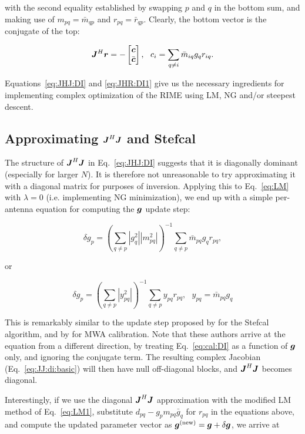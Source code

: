 \documentclass[useAMS,usenatbib]{mn2e}
\newcommand{\mat}[1]{{\bmath{#1}}}
\newcommand{\JJ}{\mat{J}} %
\begin{document}
with the second equality established by swapping $p$ and $q$ in the bottom sum, and making use of $m_{pq}=\bar{m}_{qp}$ and $r_{pq}=\bar{r}_{qp}$. Clearly, the bottom vector is the conjugate of the top:

\begin{equation}
\label{eq:JHR:DI1}
\JJ^H\bmath{r} = -\Matrix{c}{\bmath{c}\\\bar{\bmath{c}}},~~c_i = \sum\limits_{q\ne i} \bar{m}_{iq} g_q r_{iq}.
\end{equation}

Equations~\ref{eq:JHJ:DI} and \ref{eq:JHR:DI1} give us the necessary ingredients for implementing complex
optimization of the RIME using LM, NG and/or steepest descent. 

\subsection{Approximating $\JJ^H\JJ$ and Stefcal}

The structure of $\JJ^H\JJ$ in Eq.~\ref{eq:JHJ:DI} suggests that it is diagonally dominant (especially 
for larger $N$). It is therefore not unreasonable to try approximating it with a diagonal matrix for purposes 
of inversion. Applying this to Eq.~\ref{eq:LM} with $\lambda=0$ (i.e. implementing NG minimization), we end up
with a simple per-antenna equation for computing the $\bmath{g}$ update step:

\begin{equation}
\delta g_p = \left( \sum\limits_{q\ne p} |g^2_{q}| |m^2_{pq}| \right )^{-1} \sum\limits_{q\ne p} \bar{m}_{pq} g_q r_{pq},
\end{equation}

or

\begin{equation}
\label{eq:JHJ:diag}
\delta g_p = \left( \sum\limits_{q\ne p} |y^2_{pq}| \right )^{-1} \sum\limits_{q\ne p} y_{pq} r_{pq},~~~y_{pq}=\bar{m}_{pq} g_q
\end{equation}

This is remarkably similar to the update step proposed by \citet{Stefcal} for the Stefcal algorithm, 
and by \citet{Mitchell-RTS} for MWA calibration. Note that these authors arrive at the equation from a different 
direction, by treating Eq.~\ref{eq:cal:DI} as a function of $\bmath{g}$ only, and ignoring the conjugate term. The 
resulting complex Jacobian (Eq.~\ref{eq:JJ:di:basic}) will then have null off-diagonal blocks, and $\JJ^H\JJ$ becomes 
diagonal.

Interestingly, if we use the diagonal $\JJ^H\JJ$ approximation with the modified LM method of Eq.~\ref{eq:LM1}, substitute 
$d_{pq} - g_p m_{pq} \bar{g}_q $ for $r_{pq}$ in the equations above, and compute the updated parameter vector as 
$\bmath{g}^\mathrm{(new)} = \bmath{g}+\delta \bmath{g}$, we arrive at
\end{document}
